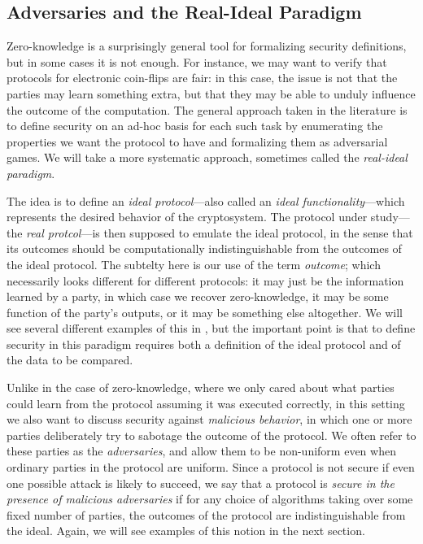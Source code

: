 \subsection{Adversaries and the Real-Ideal Paradigm}
\label{sec:real-ideal}

Zero-knowledge is a surprisingly general tool for formalizing security
definitions, but in some cases it is not enough. For instance, we may want to
verify that protocols for electronic coin-flips are fair: in this case, the
issue is not that the parties may learn something extra, but that they may be
able to unduly influence the outcome of the computation. The general approach
taken in the literature is to define security on an ad-hoc basis for each such
task by enumerating the properties we want the protocol to have and formalizing
them as adversarial games. We will take a more systematic approach, sometimes
called the \emph{real-ideal paradigm}.

The idea is to define an \emph{ideal protocol}---also called an \emph{ideal
functionality}---which represents the desired behavior of the cryptosystem. The
protocol under study---the \emph{real protcol}---is then supposed to emulate the
ideal protocol, in the sense that its outcomes should be computationally
indistinguishable from the outcomes of the ideal protocol. The subtelty here is
our use of the term \emph{outcome}; which necessarily looks different for
different protocols: it may just be the information learned by a party, in which
case we recover zero-knowledge, it may be some function of the party's outputs,
or it may be something else altogether. We will see several different examples
of this in , but the important point is that to define
security in this paradigm requires both a definition of the ideal protocol and
of the data to be compared.

Unlike in the case of zero-knowledge, where we only cared about what parties
could learn from the protocol assuming it was executed correctly, in this
setting we also want to discuss security against \emph{malicious behavior}, in
which one or more parties deliberately try to sabotage the outcome of the
protocol. We often refer to these parties as the \emph{adversaries}, and allow
them to be non-uniform even when ordinary parties in the protocol are uniform.
Since a protocol is not secure if even one possible attack is likely to succeed,
we say that a protocol is \emph{secure in the presence of malicious adversaries}
if for any choice of algorithms taking over some fixed number of parties, the
outcomes of the protocol are indistinguishable from the ideal. Again, we will
see examples of this notion in the next section.

